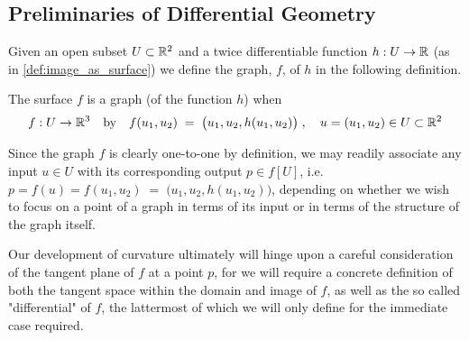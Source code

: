\subsection{Preliminaries of Differential Geometry}
    Given an open subset $U\subset \mathbb{R}^2$ and a twice differentiable function  $h: U \to \mathbb{R}$ (as in \cref{def:image_as_surface})
    we define the graph, $f$, of $h$ in the following definition.
    
    \begin{defn} \label{def:graph}
    The surface $f$ is a graph (of the function $h$) when 
    \[
     f: U \to \mathbb{R}^3 \quad \textrm{by} \quad f(u_1, u_2) \;=\; \big(u_1 , u_2 , h(u_1,u_2)\big)
     \;,\quad u = (u_1, u_2) \in U \subset \mathbb{R}^2 \]
    \end{defn}
    Since the graph $f$ is clearly one-to-one by definition, we may readily associate any input $u\in U$ with
    its corresponding output $p \in f[U]$, i.e.
    $ p = f(u) = f(u_1, u_2) \;=\; \big(u_1 , u_2 , h(u_1,u_2)\big)$,
    depending on whether we wish to focus on a point of a graph in terms of its input
    or in terms of the structure of the graph itself.
    
    Our development of curvature ultimately will hinge upon a careful consideration of the tangent plane of $f$ at a point $p$, for we will require a concrete definition of both the tangent space within the domain and image of $f$,
    as well as the so called "differential" of $f$,
    the lattermost of which we will only define for the immediate case required.
    
